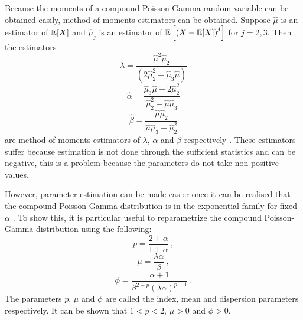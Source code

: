 Because the moments of a compound Poisson-Gamma random variable can be obtained easily, method of moments estimators can be obtained. Suppose $\widehat{\mu}$ is an estimator of $\operatorname{\mathbb{E}}[X]$ and $\widehat{\mu}_j$ is an estimator of $\operatorname{\mathbb{E}}\left[\left(X-\operatorname{\mathbb{E}}[X]\right)^j\right]$ for $j=2,3$. Then the estimators
\begin{equation}
	\widehat{\lambda}=\frac{\widehat{\mu}^2\widehat{\mu}_2}{\left(2\widehat{\mu}_2^2-\widehat{\mu}_3\widehat{\mu}\right)}
\end{equation}
\begin{equation}
	\widehat{\alpha}=\frac{\widehat{\mu}_3\widehat{\mu}-2\widehat{\mu}_2^2}{\widehat{\mu}_2^2-\widehat{\mu}\widehat{\mu}_3}
\end{equation}
\begin{equation}
	\widehat{\beta}=\frac{\widehat{\mu}\widehat{\mu}_2}{\widehat{\mu}\widehat{\mu}_3-\widehat{\mu}_2^2}
\end{equation}
are method of moments estimators of $\lambda$, $\alpha$ and $\beta$ respectively \citep{withers2011compound}. These estimators suffer because estimation is not done through the sufficient statistics and can be negative, this is a problem because the parameters do not take non-positive values.

However, parameter estimation can be made easier once it can be realised that the compound Poisson-Gamma distribution is in the exponential family for fixed $\alpha$ \citep{jorgensen1987exponential}. To show this, it is particular useful to reparametrize the compound Poisson-Gamma distribution using the following:
\begin{equation}
	p=\frac{2+\alpha}{1+\alpha}
	\ ,
\end{equation}
\begin{equation}
	\mu=\frac{\lambda\alpha}{\beta}
	\ ,
\end{equation}
\begin{equation}
	\phi = \frac{\alpha+1}{\beta^{2-p}(\lambda\alpha)^{p-1}}
	\ .
\end{equation}
The parameters $p$, $\mu$ and $\phi$ are called the index, mean and dispersion parameters respectively. It can be shown that $1<p<2$, $\mu>0$ and $\phi>0$.


